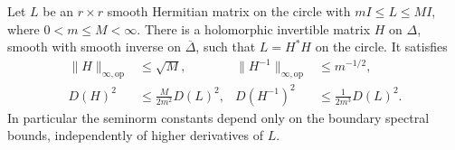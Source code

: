 \begin{lemma}\label{lem:boundary-factorization}
Let $L$ be an $r\times r$ smooth Hermitian matrix on the circle with
$mI\le L\le MI$, where $0<m\le M<\infty$.  There is a holomorphic
invertible matrix $H$ on $\Delta$, smooth with smooth inverse on
$\overline\Delta$, such that $L=H^*H$ on the circle.  It satisfies
\begin{align}
 \|H\|_{\infty,\mathrm{op}}&\le\sqrt M,&
 \|H^{-1}\|_{\infty,\mathrm{op}}&\le m^{-1/2},\label{disc:factor-sup}\\
 D(H)^2&\le\frac{M}{2m^2}D(L)^2,&
 D(H^{-1})^2&\le\frac1{2m^3}D(L)^2.
 \label{disc:factor-seminorm}
\end{align}
In particular the seminorm constants depend only on the boundary
spectral bounds, independently of higher derivatives of $L$.
\end{lemma}

